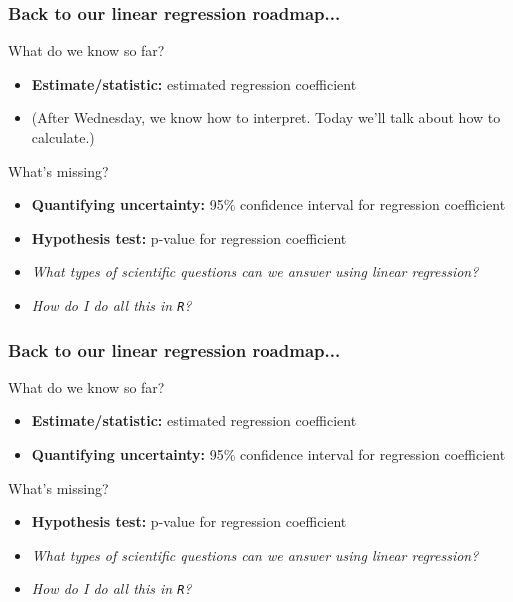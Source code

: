 \documentclass[12pt, 
hyperref={colorlinks=true, linkcolor=blue, urlcolor=cyan},dvipsnames]{beamer}
\begin{document}
\begin{frame}
\frametitle{Back to our linear regression roadmap...}
\color{blue} What do we know so far? \color{black}%
\begin{itemize}
\item \textbf{Estimate/statistic:} estimated regression coefficient
\item[] (After Wednesday, we know how to interpret. Today we'll talk about how to calculate.)
\end{itemize}

\color{blue} What's missing? \color{black} %
\begin{itemize}
\item \textbf{Quantifying uncertainty:} 95\% confidence interval for regression coefficient
\item \textbf{Hypothesis test:} p-value for regression coefficient 
\item \textit{What types of scientific questions can we answer using linear regression?}
\item \textit{How do I do all this in \texttt{R}?}
\end{itemize}
\end{frame}

\begin{frame}[noframenumbering]
\frametitle{Back to our linear regression roadmap...}
\color{blue} What do we know so far? \color{black}%
\begin{itemize}
\item \textbf{Estimate/statistic:} estimated regression coefficient
\item \textbf{Quantifying uncertainty:} 95\% confidence interval for regression coefficient
\end{itemize}

\color{blue} What's missing? \color{black} %
\begin{itemize}
\item \textbf{Hypothesis test:} p-value for regression coefficient 
\item \textit{What types of scientific questions can we answer using linear regression?}
\item \textit{How do I do all this in \texttt{R}?}
\end{itemize}
\end{frame}
\end{document}
